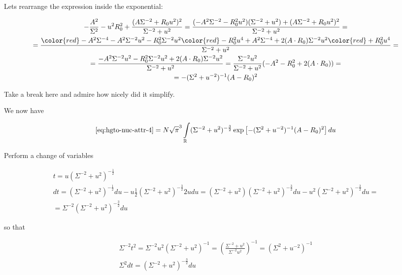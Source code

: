 \documentclass{article}
\begin{document}
\begin{appendices}
Lets rearrange the expression inside the exponential:

\begin{equation} \label{eq:hgto-nuc-attr-5}
\begin{gathered}
- \frac{A^2}{\Sigma^2}  - u^2 R_0^2 + \frac{(A \Sigma^{-2} + R_0 u^2)^2}{\Sigma^{-2} + u^2} = \frac{(-A^2\Sigma^{-2}  -  R_0^2u^2)(\Sigma^{-2} + u^2) + (A \Sigma^{-2} + R_0 u^2)^2}{\Sigma^{-2} + u^2} = \\
= \frac{{\color{red}-A^2\Sigma^{-4}} - A^2\Sigma^{-2}u^2 -R_0^2\Sigma^{-2}u^2 {\color{red}- R_0^2u^4 + A^2\Sigma^{-4}} + 2(A\cdot R_0)\Sigma^{-2}u^2 {\color{red}+ R_0^2u^4} }{\Sigma^{-2} + u^2} = \\
= \frac{- A^2\Sigma^{-2}u^2 -R_0^2\Sigma^{-2}u^2 + 2(A\cdot R_0)\Sigma^{-2}u^2 }{\Sigma^{-2} + u^2} = \frac{\Sigma^{-2}u^2}{\Sigma^{-2} + u^2} (-A^2 - R_0^2 + 2(A\cdot R_0)) = \\
= - (\Sigma^2 + u^{-2})^{-1} (A-R_0)^2
\end{gathered}
\end{equation}

Take a break here and admire how nicely did it simplify.

We now have

\begin{equation} \label{eq:hgto-nuc-attr-6}
\eqref{eq:hgto-nuc-attr-4} = N \sqrt{\pi}^3 \int\limits_{\mathbb{R}} (\Sigma^{-2} + u^2)^{-\frac{3}{2}} \exp\left[ - (\Sigma^2 + u^{-2})^{-1} (A-R_0)^2 \right] du
\end{equation}

Perform a change of variables

\begin{equation}
\begin{gathered}
t = u(\Sigma^{-2} + u^2)^{-\frac{1}{2}} \\
dt = (\Sigma^{-2} + u^2)^{-\frac{1}{2}} du - u \frac{1}{2} (\Sigma^{-2} + u^2)^{-\frac{3}{2}} 2u du =
(\Sigma^{-2} + u^2) (\Sigma^{-2} + u^2)^{-\frac{3}{2}} du - u^2 (\Sigma^{-2} + u^2)^{-\frac{3}{2}} du = \\
= \Sigma^{-2} (\Sigma^{-2} + u^2)^{-\frac{3}{2}} du
\end{gathered}
\end{equation}

so that

\begin{equation}
\begin{gathered}
\Sigma^{-2} t^2  = \Sigma^{-2}u^2 (\Sigma^{-2} + u^2)^{-1} = \left(\frac{\Sigma^{-2} + u^2}{\Sigma^{-2}u^2}\right)^{-1} = (\Sigma^2+u^{-2})^{-1} \\
\Sigma^2 dt = (\Sigma^{-2} + u^2)^{-\frac{3}{2}} du
\end{gathered}
\end{equation}


\end{appendices}
\end{document}
